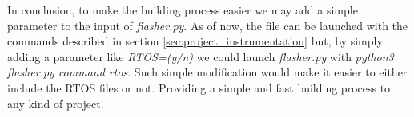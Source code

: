 In conclusion, to make the building process easier we may add a simple parameter
to the input of \textit{flasher.py}. As of now, the file can be launched with
the commands described in section \ref{sec:project_instrumentation} but, by simply
adding a parameter like \textit{RTOS=(y/n)} we could launch \textit{flasher.py} with
\textit{python3 flasher.py command rtos}. Such simple modification would make it
easier to either include the RTOS files or not. Providing a simple and fast
building process to any kind of project.